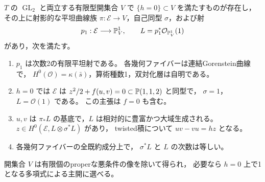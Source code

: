 \begin{lemma}\label{lem:degree-two-all-top-gorenstein-curve}
$T$ の $\operatorname{GL}_2$ と両立する有限型開集合 $V$ で
$\{h=0\}\subset V$ を満たすものが存在し，その上に射影的な平坦曲線族
$\pi:\mathcal E\to V$，自己同型 $\sigma$，および射
\[
 p_1:\mathcal E\longrightarrow\mathbb P^1_V,
 \qquad L=p_1^*\mathcal O_{\mathbb P^1_V}(1)
\]
があり，次を満たす。
\begin{enumerate}
 \item $p_1$ は次数2の有限平坦射である。
       各幾何ファイバーは連結Gorenstein曲線で，
       $H^0(\mathcal O)=\kappa(\bar s)$，算術種数1，双対化層は自明である。
 \item $h=0$ では $\mathcal E$ は
       $z^2/2+f(u,v)=0\subset\mathbb P(1,1,2)$ と同型で，
       $\sigma=1$，$L=\mathcal O(1)$ である。
       この主張は $f=0$ も含む。
 \item $u,v$ は $\pi_*L$ の基底で，$L$ は相対的に豊富かつ大域生成される。
       $z\in H^0(\mathcal E,L\otimes\sigma^*L)$ があり，
       twisted積について $uv-vu=hz$ となる。
 \item 各幾何ファイバーの全既約成分上で，
       $\sigma^*L$ と $L$ の次数は等しい。
\end{enumerate}
開集合 $V$ は有限個のproperな悪条件の像を除いて得られ，
必要なら $h=0$ 上で1となる多項式による主開に選べる。
\end{lemma}

